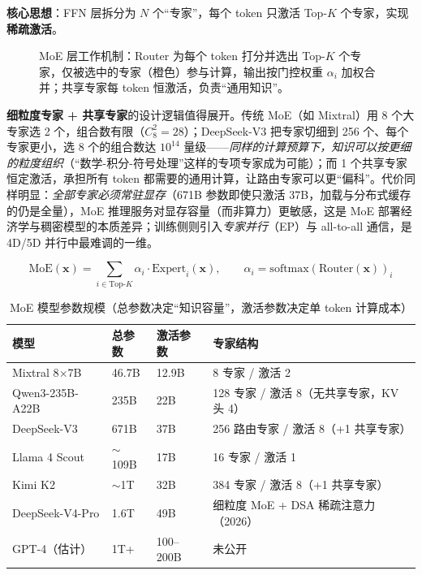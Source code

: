 \documentclass[12pt,a4paper]{article}
\begin{document}
\textbf{核心思想}：FFN 层拆分为 $N$ 个“专家”，每个 token 只激活 Top-$K$ 个专家，实现\textbf{稀疏激活}。

\begin{figure}[htbp]
\centering
\resizebox{0.97\textwidth}{!}{%

}%
\caption{MoE 层工作机制：Router 为每个 token 打分并选出 Top-$K$ 个专家，仅被选中的专家（橙色）参与计算，输出按门控权重 $\alpha_i$ 加权合并；共享专家每 token 恒激活，负责“通用知识”。}
\label{fig:moe}
\end{figure}

\textbf{细粒度专家 + 共享专家}的设计逻辑值得展开。传统 MoE（如 Mixtral）用 8 个大专家选 2 个，组合数有限（$C_8^2=28$）；DeepSeek-V3 把专家切细到 256 个、每个专家更小，选 8 个的组合数达 $10^{14}$ 量级——\emph{同样的计算预算下，知识可以按更细的粒度组织}（“数学-积分-符号处理”这样的专项专家成为可能）；而 1 个共享专家恒定激活，承担所有 token 都需要的通用计算，让路由专家可以更“偏科”。代价同样明显：\emph{全部专家必须常驻显存}（671B 参数即使只激活 37B，加载与分布式缓存的仍是全量），MoE 推理服务对显存容量（而非算力）更敏感，这是 MoE 部署经济学与稠密模型的本质差异；训练侧则引入\emph{专家并行}（EP）与 all-to-all 通信，是 4D/5D 并行中最难调的一维。

\[
\text{MoE}(\mathbf{x}) = \sum_{i \in \text{Top-}K} \alpha_i \cdot \text{Expert}_i(\mathbf{x}), \qquad
\alpha_i = \text{softmax}(\text{Router}(\mathbf{x}))_i
\]

\begin{table}[htbp]
\centering
\small
\begin{tabular}{@{}llll@{}}
\toprule
\textbf{模型} & \textbf{总参数} & \textbf{激活参数} & \textbf{专家结构}\\
\midrule
Mixtral 8$\times$7B & 46.7B & 12.9B & 8 专家 / 激活 2\\
Qwen3-235B-A22B & 235B & 22B & 128 专家 / 激活 8（无共享专家，KV 头 4）\\
DeepSeek-V3 & 671B & 37B & 256 路由专家 / 激活 8（+1 共享专家）\\
Llama 4 Scout & $\sim$109B & 17B & 16 专家 / 激活 1\\
Kimi K2 & $\sim$1T & 32B & 384 专家 / 激活 8（+1 共享专家）\\
DeepSeek-V4-Pro & 1.6T & 49B & 细粒度 MoE + DSA 稀疏注意力（2026）\\
GPT-4（估计） & 1T+ & 100--200B & 未公开\\
\bottomrule
\end{tabular}
\caption{MoE 模型参数规模（总参数决定“知识容量”，激活参数决定单 token 计算成本）}
\end{table}
\end{document}
